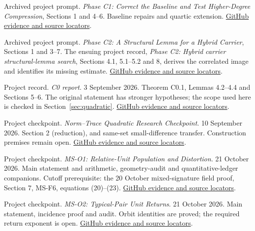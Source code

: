 Archived project prompt. \emph{Phase C1: Correct the Baseline and Test Higher-Degree Compression}, Sections 1 and 4--6. Baseline repairs and quartic extension. \href{https://github.com/hnt119/polynomial-image-compression/blob/bd1f2d663262821575eebdfa559b7c25f76b46ab/research/exports/2026-11-05-report-references/README.md#ref8}{GitHub evidence and source locators}.

Archived project prompt. \emph{Phase C2: A Structural Lemma for a Hybrid Carrier}, Sections 1 and 3--7. The ensuing project record, \emph{Phase C2: Hybrid carrier structural-lemma search}, Sections 4.1, 5.1--5.2 and 8, derives the correlated image and identifies its missing estimate. \href{https://github.com/hnt119/polynomial-image-compression/blob/bd1f2d663262821575eebdfa559b7c25f76b46ab/research/exports/2026-11-05-report-references/README.md#ref9}{GitHub evidence and source locators}.

Project record. \emph{C0 report}. 3 September 2026. Theorem C0.1, Lemmas 4.2--4.4 and Sections 5--6. The original statement has stronger hypotheses; the scope used here is checked in Section~\ref{sec:quadratic}. \href{https://github.com/hnt119/polynomial-image-compression/blob/bd1f2d663262821575eebdfa559b7c25f76b46ab/research/exports/2026-11-05-report-references/README.md#ref10}{GitHub evidence and source locators}.

Project checkpoint. \emph{Norm--Trace Quadratic Research Checkpoint}. 10 September 2026. Section 2 (reduction), and same-set small-difference transfer. Construction premises remain open. \href{https://github.com/hnt119/polynomial-image-compression/blob/bd1f2d663262821575eebdfa559b7c25f76b46ab/research/exports/2026-11-05-report-references/README.md#ref11}{GitHub evidence and source locators}.

Project checkpoint. \emph{MS-O1: Relative-Unit Population and Distortion}. 21 October 2026. Main statement and arithmetic, geometry-audit and quantitative-ledger companions. Cutoff prerequisite: the 20 October mixed-signature field proof, Section 7, MS-F6, equations (20)--(23). \href{https://github.com/hnt119/polynomial-image-compression/blob/bd1f2d663262821575eebdfa559b7c25f76b46ab/research/exports/2026-11-05-report-references/README.md#ref12}{GitHub evidence and source locators}.

Project checkpoint. \emph{MS-O2: Typical-Pair Unit Returns}. 21 October 2026. Main statement, incidence proof and audit. Orbit identities are proved; the required return exponent is open. \href{https://github.com/hnt119/polynomial-image-compression/blob/bd1f2d663262821575eebdfa559b7c25f76b46ab/research/exports/2026-11-05-report-references/README.md#ref13}{GitHub evidence and source locators}.

